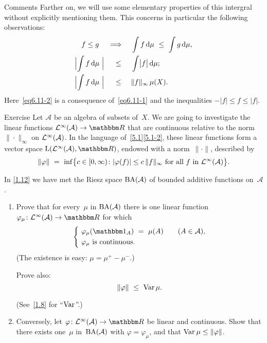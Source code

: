 \documentclass[main.tex]{subfiles}
\begin{document}
%
%
\begin{psec}{6.11}{Comments}
Farther on,
we will use some elementary properties of this intergral
without explicitly mentioning them.
This concerns in particular the following observations:
\begin{alignat}{2}
\label{eq6.11-1}f\leq g\quad\implies\quad 
 &\int f\,\mathrm d\mu \ \leq\ \int g\,\mathrm d\mu\htam{,} \\
\label{eq6.11-2}\Bigl| \int f\,\mathrm d\mu\ \Bigr|\ \quad\leq\ \quad
 &\int\bigl|f\bigr|\,\mathrm d\mu\htam{;}\\
\label{eq6.11-3}\Bigl| \int f\,\mathrm d\mu\ \Bigr|\ \quad\leq\ \quad
&\|f\|_\infty\, \mu(X)\htam{.}
\end{alignat}
Here~\eqref{eq6.11-2} is a consequence of~\eqref{eq6.11-1}
and the inequalities $-|f|\leq f\leq |f|$.
\end{psec}
%
%
\begin{psec}{6.12}{Exercise}
Let $\mathcal A$ be an algebra of subsets of~$X$.
We are going to investigate the linear functions $\BLeb(\mathcal A)\ra \R$
that are continuous relative to 
the norm~$\|\cdot\|_\infty$ on $\mathcal{L}^\infty(\mathcal A)$.
In the language of~\ref{5.1}\ref{5.1-2},
these linear functions form a vector space
$\Lin(\BLeb(\mathcal{A}),\R)$,
endowed with a norm~$\|\cdot\|$,
described by
\begin{equation*}
\|\varphi\|\ =\ \inf\bigl\{
c\in[0,\infty)\colon |\varphi(f)|\leq c\,\|f\|_\infty
\text{ for all }f\text{ in }\mathcal{L}^\infty(\mathcal A)\bigr\}\text{.}
\end{equation*}

In \ref{1.12} we have met the Riesz space $\mathrm{BA}(\mathcal A)$
of bounded additive functions on~$\mathcal A$.
\begin{enumerate}
\item\label{6.12-1}
Prove that for every~$\mu$ in $\mathrm{BA}(\mathcal A)$
there is one linear function
$\varphi_\mu\colon \BLeb(\mathcal A)\ra \R$
for which
\begin{equation*}
\left\{
\ 
\begin{aligned}
&\varphi_\mu(\mathbb{1}_A)\ =\ \mu(A)\qquad (A\in\mathcal A)\htam{,} \\
&\varphi_\mu\htam{ is continuous.}
\end{aligned}
\right.
\end{equation*}
(The existence is easy: $\mu=\mu^+-\mu^-$.)

Prove also:
\begin{equation*}
\|\varphi\|\ \leq\ \Var{}{\mu}\htam{.}
\end{equation*}
(See~\ref{1.8} for ``$\mathop{\mathrm{Var}}_{}$''.)
%
\item\label{6.12-2}
Conversely,
let $\varphi\colon\BLeb(\mathcal A)\ra\R$ be linear and continuous.
Show that there exists one~$\mu$ in~$\mathrm{BA}(\mathcal A)$
with $\varphi=\varphi_\mu$,
and that $\mathop{\mathrm{Var}}_{}\mu\leq\|\varphi\|$.
\end{enumerate}
\end{psec}
\end{document}
